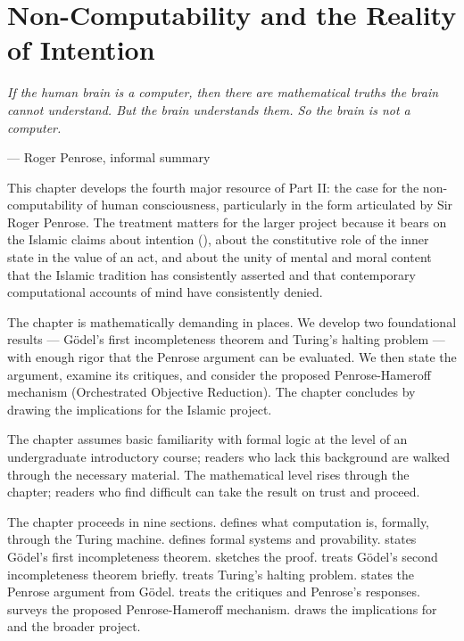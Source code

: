 \chapter{Non-Computability and the Reality of Intention}
\label{ch:non-computability}

\epigraph{\itshape If the human brain is a computer, then there are
mathematical truths the brain cannot understand. But the brain
understands them. So the brain is not a computer.}{--- Roger Penrose,
informal summary}

\noindent
This chapter develops the fourth major resource of Part II: the
case for the non-computability of human consciousness, particularly
in the form articulated by Sir Roger Penrose. The treatment matters
for the larger project because it bears on the Islamic claims about
intention (), about the constitutive role of the inner
state in the value of an act, and about the unity of mental and
moral content that the Islamic tradition has consistently asserted
and that contemporary computational accounts of mind have
consistently denied.

The chapter is mathematically demanding in places. We develop two
foundational results --- G\"odel's first incompleteness theorem and
Turing's halting problem --- with enough rigor that the Penrose
argument can be evaluated. We then state the argument, examine its
critiques, and consider the proposed Penrose-Hameroff mechanism
(Orchestrated Objective Reduction). The chapter concludes by drawing
the implications for the Islamic project.

The chapter assumes basic familiarity with formal logic at the level
of an undergraduate introductory course; readers who lack this
background are walked through the necessary material. The
mathematical level rises through the chapter; readers who find
 difficult can take the result on trust and
proceed.

The chapter proceeds in nine sections.
 defines what computation is, formally,
through the Turing machine.
 defines formal systems and provability.
 states G\"odel's first incompleteness
theorem.
 sketches the proof.
 treats G\"odel's second incompleteness
theorem briefly.
 treats Turing's halting problem.
 states the Penrose argument from G\"odel.
 treats the critiques and Penrose's
responses.
 surveys the proposed Penrose-Hameroff mechanism.
 draws the implications for
 and the broader project.

